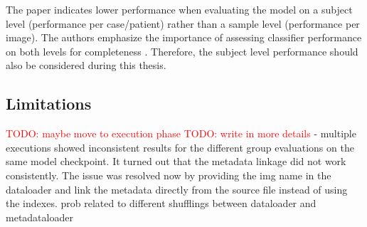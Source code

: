 \documentclass[12pt, a4paper, oneside]{book}   	%
\renewcommand{\todo}[1]{\textcolor{red}{TODO: #1}}
\begin{document}
			  The paper indicates lower performance when evaluating the model on a subject level (performance per case/patient) rather than a sample level (performance per image). The authors emphasize the importance of assessing classifier performance on both levels for completeness \autocite{Gottfrois2024}. Therefore, the subject level performance should also be considered during this thesis.
	
		\subsection{Limitations}
				\todo{maybe move to execution phase}
				\todo{write in more details}
			   - multiple executions showed inconsistent results for the different group evaluations on the same model checkpoint. It turned out that the metadata linkage did not work consistently. The issue was resolved now by providing the img name in the dataloader and link the metadata directly from the source file instead of using the indexes. prob related to different shufflings between dataloader and metadataloader
		
\end{document}
